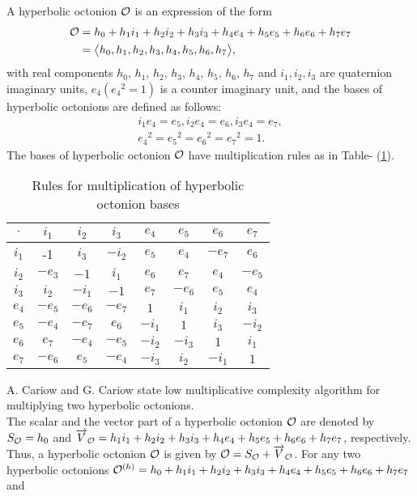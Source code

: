 \noindent A hyperbolic octonion ${{\mathcal{O}}}$ is an expression of the form
\begin{align*}
{{\mathcal{O}}}&=h_0+h_1i_1+h_2i_2+h_3i_3+h_4e_4+h_5e_5+h_6e_6+h_7e_7\\&=\big\langle h_0,h_1, h_2, h_3, h_4, h_5,h_6,h_7 \big\rangle,
\end{align*}
with real components $h_0$, $h_1$, $h_2$, $h_3$, $h_4$, $h_5$, $h_6$, $h_7$ and  $i_1, i_2, i_3$ are quaternion imaginary units, $e_4 ({e_4}^2=1)$ is a counter imaginary unit, and the bases of hyperbolic octonions are defined as follows:
\begin{align*}
i_1e_4=e_5, i_2e_4=e_6,i_3e_4=e_7,\\
{e_4}^2={e_5}^2={e_6}^2={e_7}^2=1.
\end{align*}
The bases of hyperbolic octonion ${{\mathcal{O}}}$ have multiplication rules as in Table- (\ref{t711}).
\begin{table}[H] \label{t711}
\begin{center}\vspace{3mm}
\begin{tabular}{|c|c|c|c|c|c|c|c|}
\hline 
$\cdot$ & $i_1$ & $i_2$ & $i_3$ & $e_4$ & $e_5$ & $e_6$ & $e_7$ \\ 
\hline 
$i_1$ & -1 & $i_3$ & $-i_2$ & $e_5$ & $e_4$ & $-e_7$ & $e_6$ \\ 
\hline 
$i_2$ & $-e_3$ & $-1$ & $i_1$ & $e_6$ & $e_7$ & $e_4$ & $-e_5$ \\ 
\hline 
$i_3$ & $i_2$ & $-i_1 $& $-1$ &$ e_7$ & $-e_6$ & $e_5$ & $e_4$ \\ 
\hline 
$e_4$ & $-e_5$ & $-e_6$ & $-e_7$ & $1$ & $i_1$ & $i_2$ &$ i_3$ \\ 
\hline 
$e_5$ & $-e_4$ & $-e_7$ & $e_6$ & $-i_1$ & $1$ & $i_3$ & $-i_2$ \\ 
\hline 
$e_6$ & $e_7$ & $-e_4$ & $-e_5$ & $-i_2$ & $-i_3$ & $1$ & $i_1$ \\ 
\hline 
$e_7$ & $-e_6$ & $e_5$ & $-e_4$ & $-i_3$ & $i_2$ & $-i_1$ & $1$ \\ 
\hline 
\end{tabular}
\vspace{3mm}
\caption{Rules for multiplication of hyperbolic octonion bases }
\end{center}
\end{table}
\noindent A. Cariow and G. Cariow \cite{28} state low multiplicative complexity algorithm for multiplying two hyperbolic octonions.\\
The scalar and the vector part of a hyperbolic octonion ${{\mathcal{O}}}$ are denoted by $S_{{{\mathcal{O}}}}=h_0$ and $\overrightarrow{V}_{{{\mathcal{O}}}}=h_1i_1+h_2i_2+h_3i_3+h_4e_4+h_5e_5+h_6e_6+h_7e_7$, respectively. Thus, a hyperbolic octonion ${{\mathcal{O}}}$ is given by ${{\mathcal{O}}}=S_{{{\mathcal{O}}}}+\overrightarrow{V}_{{{\mathcal{O}}}}$. For any two hyperbolic octonions ${{\mathcal{O}}}^{(h)}=h_0+h_1i_1+h_2i_2+h_3i_3+h_4e_4+h_5e_5+h_6e_6+h_7e_7$ and 
